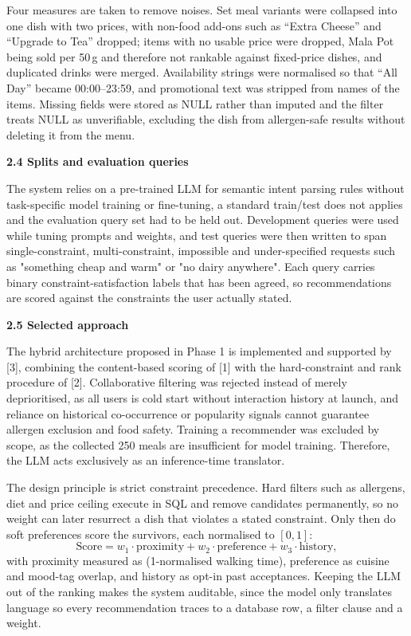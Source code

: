 \documentclass{article}
\begin{document}
Four measures are taken to remove noises. Set meal variants were collapsed into one dish with two prices, with non-food add-ons such as ``Extra Cheese'' and ``Upgrade to Tea'' dropped; items with no usable price were dropped, Mala Pot being sold per 50\,g and therefore not rankable against fixed-price dishes, and duplicated drinks were merged. Availability strings were normalised so that ``All Day'' became 00:00--23:59, and promotional text was stripped from names of the items. Missing fields were stored as NULL rather than imputed and the filter treats NULL as unverifiable, excluding the dish from allergen-safe results without deleting it from the menu.

\textbf{2.4 Splits and evaluation queries} 

The system relies on a pre-trained LLM for semantic intent parsing rules without task-specific model training or fine-tuning, a standard train/test does not applies and the evaluation query set had to be held out. Development queries were used while tuning prompts and weights, and test queries were then written to span single-constraint, multi-constraint, impossible and under-specified requests such as "something cheap and warm" or "no dairy anywhere". Each query carries binary constraint-satisfaction labels that has been agreed, so recommendations are scored against the constraints the user actually stated.

\textbf{2.5 Selected approach} 

The hybrid architecture proposed in Phase 1 is implemented and supported by [3], combining the content-based scoring of [1] with the hard-constraint and rank procedure of [2]. Collaborative filtering was rejected instead of merely deprioritised, as all users is cold start without interaction history at launch, and reliance on historical co-occurrence or popularity signals cannot guarantee allergen exclusion and food safety. Training a recommender was excluded by scope, as the collected 250 meals are insufficient for model training. Therefore, the LLM acts exclusively as an inference-time translator.

The design principle is strict constraint precedence. Hard filters such as allergens, diet and price ceiling execute in SQL and remove candidates permanently, so no weight can later resurrect a dish that violates a stated constraint. Only then do soft preferences score the survivors, each normalised to $[0,1]$:
\[
\text{Score} = w_1 \cdot \text{proximity} + w_2 \cdot \text{preference} + w_3 \cdot \text{history},
\]
with proximity measured as (1-normalised walking time), preference as cuisine and mood-tag overlap, and history as opt-in past acceptances. Keeping the LLM out of the ranking makes the system auditable, since the model only translates language so every recommendation traces to a database row, a filter clause and a weight.
\end{document}

